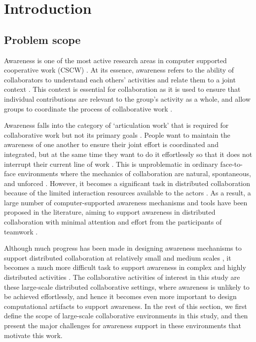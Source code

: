 \graphicspath{{Figures/}}

\chapter{Introduction} 
\label{chapter1:introduction}

\section{Problem scope}
\label{sec:problem_scope}
Awareness is one of the most active research areas in computer supported cooperative work (CSCW) \cite{dourish1992awareness,schmidt2002a,rittenbruch2009a}. At its essence, awareness refers to the ability of collaborators to understand each others' activities and relate them to a joint context \cite{rittenbruch2009a}. This context is essential for collaboration as it is used to ensure that individual contributions are relevant to the group’s activity as a whole, and allow groups to coordinate the process of collaborative work \cite{dourish1992awareness}. 

Awareness falls into the category of `articulation work' that is required for collaborative work but not its primary goals \cite{schmidt1992taking}. People want to maintain the awareness of one another to ensure their joint effort is coordinated and integrated, but at the same time they want to do it effortlessly so that it does not interrupt their current line of work \cite{fussell1998coordination}. This is unproblematic in ordinary face-to-face environments where the mechanics of collaboration are natural, spontaneous, and unforced \cite{Gutwin2002}. However, it becomes a significant task in distributed collaboration because of the limited interaction resources available to the actors \cite{carroll2003a}. As a result, a large number of computer-supported awareness mechanisms and tools have been proposed in the literature, aiming to support awareness in distributed collaboration with minimal attention and effort from the participants of teamwork \cite{rittenbruch2009a,markopoulos2009design}.

Although much progress has been made in designing awareness mechanisms to support distributed collaboration at relatively small and medium scales \cite{antunes2010a}, it becomes a much more difficult task to support awareness in complex and highly distributed activities \cite{cabitza2009promoting}. The collaborative activities of interest in this study are these large-scale distributed collaborative settings, where awareness is unlikely to be achieved effortlessly, and hence it becomes even more important to design computational artifacts to support awareness. In the rest of this section, we first define the scope of large-scale collaborative environments in this study, and then present the major challenges for awareness support in these environments that motivate this work.

